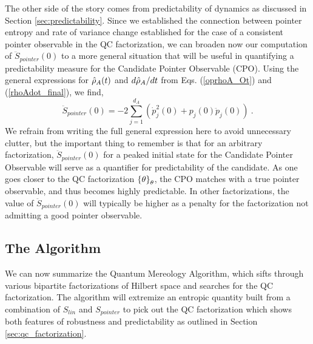 \documentclass[aps,pra,onecolumn,nofootinbib,12pt,tightenlines]{revtex4-1}
\begin{document}
{The other side of the story comes from predictability of dynamics as discussed in Section \ref{sec:predictability}. Since we established the connection between pointer entropy and rate of variance change established for the case of a consistent pointer observable in the QC factorization, we can broaden now our computation of $\ddot{S}_{pointer}(0)$ to a more general situation that will be useful in quantifying a predictability measure for the Candidate Pointer Observable (CPO).
Using the general expressions for $\hat{\rho}_{A}(t)$ and $d\hat{\rho}_{A}/dt$ from Eqs. (\ref{oprhoA_Ot}) and (\ref{rhoAdot_final}), we find,
\begin{equation}
\label{Spointerdoubledot_general}
\ddot{S}_{pointer}(0) = -2\sum_{j=1}^{d_{A}}\left(\dot{p}^{2}_{j}(0) + p_{j}(0) \ddot{p}_{j}(0)\right) \: .
\end{equation}
We refrain from writing the full general expression here to avoid unnecessary clutter, but the important thing to remember is that for an arbitrary factorization, $\ddot{S}_{pointer}(0)$ for a peaked initial state for the Candidate Pointer Observable will serve as a quantifier for predictability of the candidate. As one goes closer to the QC factorization ${\{\theta\}}_{\theta}$, the CPO matches with a true pointer observable, and thus becomes highly predictable. In other factorizations, the value of $\ddot{S}_{pointer}(0)$ will typically be higher as a penalty for the factorization not admitting a good pointer observable.
}


\subsection{The Algorithm}
\label{subsec:algo}

We can now summarize the Quantum Mereology Algorithm, which sifts through various bipartite factorizations of Hilbert space and searches for the QC factorization. The algorithm will extremize an entropic quantity built from a combination of $S_{lin}$ and $S_{pointer}$ to pick out the QC factorization which shows both features of robustness and predictability as outlined in Section \ref{sec:qc_factorization}. 
\end{document}
